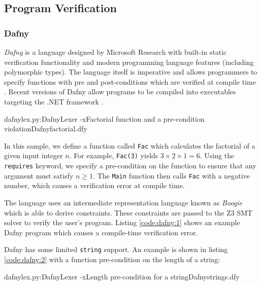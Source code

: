 \documentclass[a4paper,openany,12pt]{book}
\begin{document}
\subsection{Program Verification}

\subsubsection{Dafny}

\emph{Dafny} is a language designed by Microsoft Research with built-in static verification functionality and modern
programming language features (including polymorphic types).
The language itself is imperative and allows programmers to specify functions with pre and post-conditions which are
verified at compile time \citep{dafny2}.
Recent versions of Dafny allow programs to be compiled into executables targeting the .NET framework \citep{dafny}.

\begin{mycodefile}{dafnylex.py:DafnyLexer -x}{\label{code:dafny:1}Factorial function and a pre-condition violation}{Dafny}{factorial.dfy}
    
    In this sample, we define a function called \texttt{Fac} which calculates the factorial of a given input integer
    $n$.
    For example, \texttt{Fac(3)} yields $3 \times 2 \times 1 = 6$.
    Using the \texttt{requires} keyword, we specify a pre-condition on the function to ensure that any argument must
    satisfy $n \ge 1$.
    The \texttt{Main} function then calls \texttt{Fac} with a negative number, which causes a verification error at
    compile time.

    \vspace{0.5em}
\end{mycodefile}

The language uses an intermediate representation language known as \emph{Boogie} which is able to derive constraints.
These constraints are passed to the Z3 SMT solver to verify the user's program.
Listing \ref{code:dafny:1} shows an example Dafny program which causes a compile-time verification error.

Dafny has some limited \texttt{string} support.
An example is shown in listing \ref{code:dafny:2} with a function pre-condition on the length of a string:

\begin{mycodefile}{dafnylex.py:DafnyLexer -x}{\label{code:dafny:2}Length pre-condition for a string}{Dafny}{strings.dfy}
\end{mycodefile}
\end{document}
